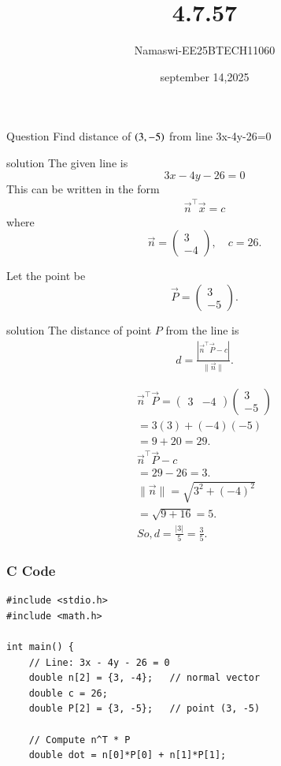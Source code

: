 \documentclass{beamer}
\begin{document}
\title 
{4.7.57}
\date{september 14,2025}


\author 
{Namaswi-EE25BTECH11060}
\frame{\titlepage}
\begin{frame}{Question}
Find distance of $\left(3,-5\right)$ from line 3x-4y-26=0
\end{frame}
\begin{frame}{solution}
The given line is
\[
3x - 4y - 26 = 0
\]
This can be written in the form 
\begin{align}
\Vec{n}^\top \Vec{x} = c
\end{align}
where 
\[
\Vec{n}= \begin{pmatrix} 3 \\ -4 \end{pmatrix}, 
\quad c = 26.
\]

Let the point be 
\[
\Vec{P}= \begin{pmatrix} 3 \\ -5 \end{pmatrix}.
\]
\end{frame}
\begin{frame}{solution}
The distance of point \(P\) from the line is
\begin{align}
d = \frac{|\Vec{n}^\top \Vec{P} - c|}{\|\Vec{n}\|}.
\end{align}

\begin{align}
\Vec{n}^\top \Vec{P} = \begin{pmatrix} 3 & -4 \end{pmatrix}
\begin{pmatrix} 3 \\ -5 \end{pmatrix}\\
= 3(3) + (-4)(-5)\\ = 9 + 20 = 29.\\
\Vec{n}^\top \Vec{P} - c\\ = 29 - 26 = 3.\\
\|\Vec{n}\| = \sqrt{3^2 + (-4)^2}\\ = \sqrt{9+16} = 5.\\
So,
d = \frac{|3|}{5} = \frac{3}{5}.
\end{align}
\end{frame}
\begin{frame}[fragile]
    \frametitle{C Code}
    \begin{lstlisting}
#include <stdio.h>
#include <math.h>

int main() {
    // Line: 3x - 4y - 26 = 0
    double n[2] = {3, -4};   // normal vector
    double c = 26;
    double P[2] = {3, -5};   // point (3, -5)

    // Compute n^T * P
    double dot = n[0]*P[0] + n[1]*P[1];
\end{lstlisting}
\end{frame}
\end{document}
